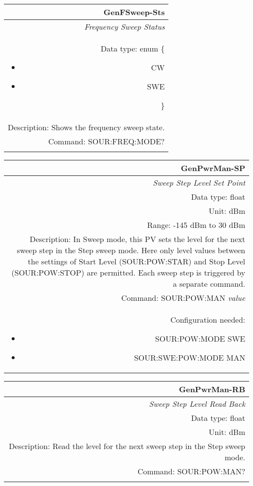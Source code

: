 \documentclass[openany]{article}
\begin{document}
		\begin{tabular}{N}
			\hline
			\bfseries GenFSweep-Sts \\ \hline
			\emph{Frequency Sweep Status} \\
			Data type: enum \{\begin{itemize}[noitemsep]
				\small
				\item[] CW
				\item[] SWE
			\end{itemize}\} \\
			Description: Shows the frequency sweep state. \\
			Command: SOUR:FREQ:MODE? \\
			\\

		\end{tabular}


		\begin{tabular}{N}
			\hline
			\bfseries GenPwrMan-SP \\ \hline
			\emph{Sweep Step Level Set Point} \\
			Data type: float \\
			Unit: dBm \\
			Range: -145 dBm to 30 dBm \\
			Description: In Sweep mode, this PV sets the level for the next sweep step in the Step sweep mode. Here only level values between the settings of  Start Level (SOUR:POW:STAR) and Stop Level (SOUR:POW:STOP) are permitted. Each sweep step is triggered by a separate command. \\
			Command: SOUR:POW:MAN \emph{value} \\
			Configuration needed:
				\begin{itemize}[noitemsep]
				\small
				\item[] SOUR:POW:MODE SWE
				\item[] SOUR:SWE:POW:MODE MAN
				\end{itemize} \\

		\end{tabular}


		\begin{tabular}{N}
			\hline
			\bfseries GenPwrMan-RB \\ \hline
			\emph{Sweep Step Level Read Back} \\
			Data type: float \\
			Unit: dBm \\
			Description: Read the level for the next sweep step in the Step sweep mode. \\
			Command: SOUR:POW:MAN? \\
			\\

		\end{tabular}
\end{document}
